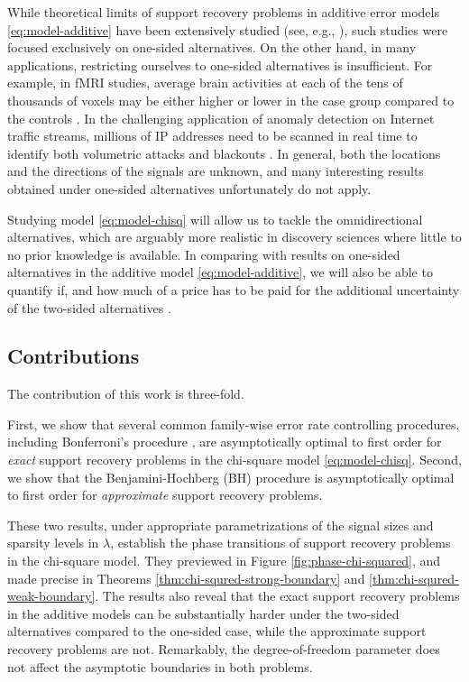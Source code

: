 While theoretical limits of support recovery problems in additive error models \eqref{eq:model-additive} have been extensively studied (see, e.g., \cite{arias2017distribution, butucea2018variable, gao2018fundamental}), such studies were focused exclusively on one-sided alternatives.
On the other hand, in many applications, restricting ourselves to one-sided alternatives is insufficient.
For example, in fMRI studies, average brain activities at each of the tens of thousands of voxels may be either higher or lower in the case group compared to the controls \citep{narayan2015two}. 
In the challenging application of anomaly detection on Internet traffic streams, millions of IP addresses need to be scanned in real time to identify both volumetric attacks and blackouts \citep{kallitsis2016amon}.
In general, both the locations and the directions of the signals are unknown, and many interesting results obtained under one-sided alternatives unfortunately do not apply.

Studying model \eqref{eq:model-chisq} will allow us to tackle the omnidirectional alternatives, which are arguably more realistic in discovery sciences where little to no prior knowledge is available.
In comparing with results on one-sided alternatives in the additive model \eqref{eq:model-additive}, we will also be able to quantify if, and how much of a price has to be paid for the additional uncertainty of the two-sided alternatives .

\subsection{Contributions}

The contribution of this work is three-fold.

First, we show that several common family-wise error rate controlling procedures, including Bonferroni's procedure \cite{dunn1961multiple}, are asymptotically optimal to first order for \emph{exact} support recovery problems in the chi-square model \eqref{eq:model-chisq}.
Second, we show that the Benjamini-Hochberg (BH) procedure \cite{benjamini1995controlling} is asymptotically optimal to first order for \emph{approximate} support recovery problems.

These two results, under appropriate parametrizations of the signal sizes and sparsity levels in $\lambda$, establish the phase transitions of support recovery problems in the chi-square model.
They previewed in Figure \ref{fig:phase-chi-squared}, and made precise in Theorems \ref{thm:chi-squred-strong-boundary} and \ref{thm:chi-squred-weak-boundary}.
The results also reveal that the exact support recovery problems in the additive models can be substantially harder under the two-sided alternatives compared to the one-sided case, while the approximate support recovery problems are not.
Remarkably, the degree-of-freedom parameter does not affect the asymptotic boundaries in both problems.


